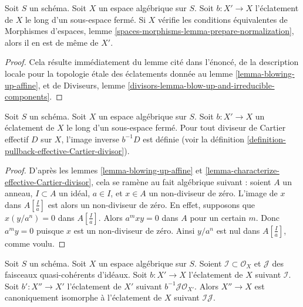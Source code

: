 \begin{lemma}
\label{lemma-blowup-finite-nr-irreducibles}
Soit $S$ un schéma. Soit $X$ un espace algébrique sur $S$. Soit
$b : X' \to X$ l'éclatement de $X$ le long d'un sous-espace fermé. Si
$X$ vérifie les conditions équivalentes de
Morphismes d'espaces, lemme \ref{spaces-morphisms-lemma-prepare-normalization},
alors il en est de même de $X'$.
\end{lemma}

\begin{proof}
Cela résulte immédiatement du lemme cité dans l'énoncé,
de la description locale pour la topologie \'etale des éclatements donnée au
lemme \ref{lemma-blowing-up-affine}, et de
Diviseurs, lemme \ref{divisors-lemma-blow-up-and-irreducible-components}.
\end{proof}

\begin{lemma}
\label{lemma-blow-up-pullback-effective-Cartier}
Soit $S$ un schéma. Soit $X$ un espace algébrique sur $S$.
Soit $b : X' \to X$ un éclatement de $X$ le long d'un sous-espace fermé.
Pour tout diviseur de Cartier effectif $D$ sur $X$, l'image inverse
$b^{-1}D$ est définie (voir la définition
\ref{definition-pullback-effective-Cartier-divisor}).
\end{lemma}

\begin{proof}
D'après les lemmes \ref{lemma-blowing-up-affine} et
\ref{lemma-characterize-effective-Cartier-divisor},
cela se ramène au fait algébrique suivant :
soient $A$ un anneau, $I \subset A$ un idéal, $a \in I$, et $x \in A$
un non-diviseur de zéro. L'image de $x$ dans $A[\frac{I}{a}]$ est alors un
non-diviseur de zéro. En effet, supposons que $x (y/a^n) = 0$ dans $A[\frac{I}{a}]$.
Alors $a^mxy = 0$ dans $A$ pour un certain $m$. Donc $a^my = 0$ puisque $x$ est un
non-diviseur de zéro. Ainsi $y/a^n$ est nul dans $A[\frac{I}{a}]$, comme voulu.
\end{proof}

\begin{lemma}
\label{lemma-blowing-up-two-ideals}
Soit $S$ un schéma. Soit $X$ un espace algébrique sur $S$.
Soient $\mathcal{I} \subset \mathcal{O}_X$ et $\mathcal{J}$ des
faisceaux quasi-cohérents d'idéaux. Soit $b : X' \to X$ l'éclatement
de $X$ suivant $\mathcal{I}$. Soit $b' : X'' \to X'$ l'éclatement de
$X'$ suivant $b^{-1}\mathcal{J} \mathcal{O}_{X'}$. Alors $X'' \to X$
est canoniquement isomorphe à l'éclatement de $X$ suivant $\mathcal{I}\mathcal{J}$.
\end{lemma}

